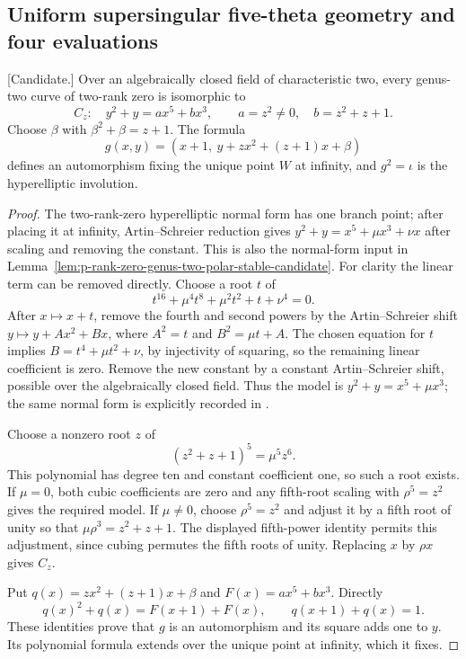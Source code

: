 \subsection{Uniform supersingular five-theta geometry and four evaluations}
\label{subsec:uniform-five-theta-geometry-candidate}

\begin{lemma}
\label{lem:uniform-f0-order-four-presentation-candidate}
\textup{[Candidate.]}
Over an algebraically closed field of characteristic two, every genus-two
curve of two-rank zero is isomorphic to
\[
 C_z:\quad y^2+y=a x^5+b x^3,\qquad
 a=z^2\ne0,\quad b=z^2+z+1.
\]
Choose $\beta$ with $\beta^2+\beta=z+1$. The formula
\[
       g(x,y)=(x+1,\ y+z x^2+(z+1)x+\beta)
\]
defines an automorphism fixing the unique point $W$ at infinity,
and $g^2=\iota$ is the hyperelliptic involution.
\end{lemma}
\begin{proof}
The two-rank-zero hyperelliptic normal form has one branch point;
after placing it at infinity, Artin--Schreier reduction gives
$y^2+y=x^5+\mu x^3+\nu x$ after scaling and removing the constant.
This is also the normal-form input in
Lemma~\ref{lem:p-rank-zero-genus-two-polar-stable-candidate}.
For clarity the linear term can be removed directly. Choose a root
$t$ of
\[
                 t^{16}+\mu^4t^8+\mu^2t^2+t+\nu^4=0.
\]
After $x\mapsto x+t$, remove the fourth and second powers by the
Artin--Schreier shift $y\mapsto y+A x^2+B x$, where
$A^2=t$ and $B^2=\mu t+A$. The chosen equation for $t$ implies
$B=t^4+\mu t^2+\nu$, by injectivity of squaring, so the remaining
linear coefficient is zero. Remove the new constant by a constant
Artin--Schreier shift, possible over the algebraically closed field.
Thus the model is
$y^2+y=x^5+\mu x^3$; the same normal form is explicitly recorded in
\cite[pp.~30--31]{BoxallGrantLeprevost2001}.

Choose a nonzero root $z$ of
\[
                       (z^2+z+1)^5=\mu^5z^6.
\]
This polynomial has degree ten and constant coefficient one, so such
a root exists. If $\mu=0$, both cubic coefficients are zero and any
fifth-root scaling with $\rho^5=z^2$ gives the required model.
If $\mu\ne0$, choose $\rho^5=z^2$ and adjust it by a fifth root of
unity so that $\mu\rho^3=z^2+z+1$. The displayed fifth-power
identity permits this adjustment, since cubing permutes the fifth
roots of unity. Replacing $x$ by $\rho x$ gives $C_z$.

Put $q(x)=z x^2+(z+1)x+\beta$ and $F(x)=a x^5+b x^3$.
Directly
\[
       q(x)^2+q(x)=F(x+1)+F(x),\qquad q(x+1)+q(x)=1.
\]
These identities prove that $g$ is an automorphism and its square
adds one to $y$. Its polynomial formula extends over the unique
point at infinity, which it fixes.
\end{proof}


